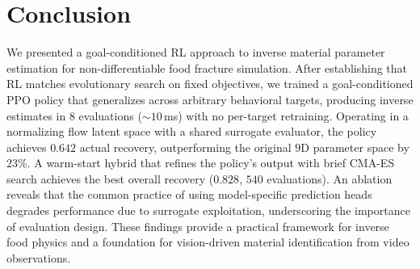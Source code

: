 \section{Conclusion}
\label{sec:conclusion}

We presented a goal-conditioned RL approach to inverse material parameter estimation for non-differentiable food fracture simulation. After establishing that RL matches evolutionary search on fixed objectives, we trained a goal-conditioned PPO policy that generalizes across arbitrary behavioral targets, producing inverse estimates in $8$ evaluations (${\sim}10$\,ms) with no per-target retraining. Operating in a normalizing flow latent space with a shared surrogate evaluator, the policy achieves $0.642$ actual recovery, outperforming the original $9$D parameter space by $23\%$. A warm-start hybrid that refines the policy's output with brief CMA-ES search achieves the best overall recovery ($0.828$, $540$ evaluations). An ablation reveals that the common practice of using model-specific prediction heads degrades performance due to surrogate exploitation, underscoring the importance of evaluation design. These findings provide a practical framework for inverse food physics and a foundation for vision-driven material identification from video observations.
